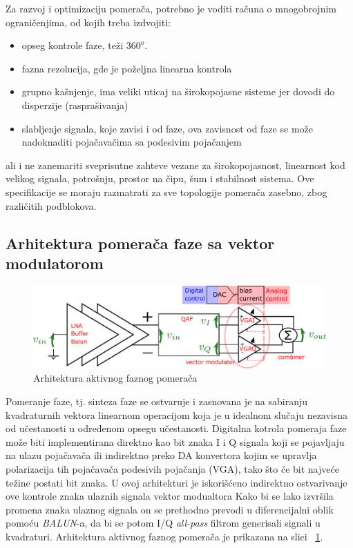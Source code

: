 \documentclass[journal,twocolumn,letterpaper]{IEEEJERM}
\begin{document}
Za razvoj i optimizaciju pomerača, potrebno je voditi računa o mnogobrojnim ograničenjima, od kojih treba izdvojiti:

\begin{itemize}

	\item opseg kontrole faze, teži $360^o$.
	\item fazna rezolucija, gde je poželjna linearna kontrola
	\item grupno kašnjenje, ima veliki uticaj na širokopojasne sisteme jer dovodi do disperzije (rasprašivanja)
	\item slabljenje signala, koje zavisi i od faze, ova zavisnost od faze se može nadoknaditi pojačavačima sa podesivim pojačanjem

\end{itemize}

ali i ne zanemariti sveprisutne zahteve vezane za širokopojasnost, linearnost kod velikog signala, potrošnju, prostor na čipu, šum i stabilnost sistema. Ove specifikacije se moraju razmatrati za sve topologije pomerača zasebno, zbog različitih podblokova.

\subsection{Arhitektura pomerača faze sa vektor modulatorom}

\begin{figure}[!htbp]
  \centering
  \includegraphics[width=\linewidth]{pshift_arch2.pdf}
  \caption{Arhitektura aktivnog faznog pomerača}
  \label{fig:pshift_arch}
\end{figure}


Pomeranje faze, tj. sinteza faze se ostvaruje i zasnovana je na sabiranju kvadraturnih vektora linearnom operacijom koja je u idealnom slučaju nezavisna od učestanosti u određenom opsegu učestanosti. Digitalna kotrola pomeraja faze može biti implementirana direktno kao bit znaka I i Q signala koji se pojavljaju na ulazu pojačavača ili indirektno preko DA konvertora kojim se upravlja polarizacija tih pojačavača podesivih pojačanja (VGA), tako što će bit najveće težine postati bit znaka. U ovoj arhitekturi je iskorišćeno indirektno ostvarivanje ove kontrole znaka ulaznih signala vektor modualtora  Kako bi se lako izvršila promena znaka ulaznog signala on se prethodno prevodi u diferencijalni oblik pomoću \textit{BALUN}-a, da bi se potom I/Q \textit{all-pass} filtrom generisali signali u kvadraturi. Arhitektura aktivnog faznog pomerača je prikazana na slici ~\ref{fig:pshift_arch}.\cite{ellinger10}
\end{document}
